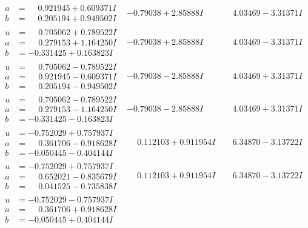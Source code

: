 \documentclass[1p]{elsarticle_modified}
\theoremstyle{definition}
\begin{document}
$$\begin{array}{c|c|c}
\begin{aligned}
a &= \phantom{-}0.921945 + 0.609371 I \\
b &= \phantom{-}0.205194 + 0.949502 I\end{aligned}
 & -0.79038 + 2.85888 I & \phantom{-}4.03469 - 3.31371 I \\ \hline\begin{aligned}
u &= \phantom{-}0.705062 + 0.789522 I \\
a &= \phantom{-}0.279153 + 1.164250 I \\
b &= -0.331425 + 0.163823 I\end{aligned}
 & -0.79038 + 2.85888 I & \phantom{-}4.03469 - 3.31371 I \\ \hline\begin{aligned}
u &= \phantom{-}0.705062 - 0.789522 I \\
a &= \phantom{-}0.921945 - 0.609371 I \\
b &= \phantom{-}0.205194 - 0.949502 I\end{aligned}
 & -0.79038 - 2.85888 I & \phantom{-}4.03469 + 3.31371 I \\ \hline\begin{aligned}
u &= \phantom{-}0.705062 - 0.789522 I \\
a &= \phantom{-}0.279153 - 1.164250 I \\
b &= -0.331425 - 0.163823 I\end{aligned}
 & -0.79038 - 2.85888 I & \phantom{-}4.03469 + 3.31371 I \\ \hline\begin{aligned}
u &= -0.752029 + 0.757937 I \\
a &= \phantom{-}0.361706 - 0.918628 I \\
b &= -0.050445 - 0.404144 I\end{aligned}
 & \phantom{-}0.112103 + 0.911954 I & \phantom{-}6.34870 - 3.13722 I \\ \hline\begin{aligned}
u &= -0.752029 + 0.757937 I \\
a &= \phantom{-}0.652021 - 0.835679 I \\
b &= \phantom{-}0.041525 - 0.735838 I\end{aligned}
 & \phantom{-}0.112103 + 0.911954 I & \phantom{-}6.34870 - 3.13722 I \\ \hline\begin{aligned}
u &= -0.752029 - 0.757937 I \\
a &= \phantom{-}0.361706 + 0.918628 I \\
b &= -0.050445 + 0.404144 I\end{aligned}

\end{array}$$
\end{document}

